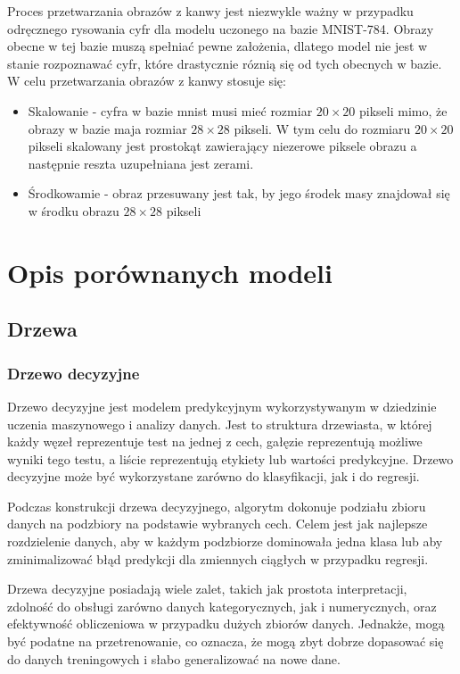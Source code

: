 \documentclass{article}
\begin{document}
Proces przetwarzania obrazów z kanwy jest niezwykle ważny
w przypadku odręcznego rysowania cyfr dla modelu uczonego
na bazie MNIST-784. Obrazy obecne w tej bazie muszą spełniać 
pewne założenia, dlatego model nie jest w stanie rozpoznawać
cyfr, które drastycznie róznią się od tych obecnych w bazie.
W celu przetwarzania obrazów z kanwy stosuje się:
\begin{itemize}
    \item Skalowanie - cyfra w bazie mnist musi mieć rozmiar $20\times20$ pikseli mimo, że obrazy w bazie maja rozmiar $28\times28$ pikseli. W tym celu do rozmiaru $20\times20$ pikseli skalowany jest prostokąt zawierający niezerowe piksele obrazu a następnie reszta uzupełniana jest zerami.
    \item Środkowamie - obraz przesuwany jest tak, by jego środek masy znajdował się w środku obrazu $28\times28$ pikseli
\end{itemize}



\section{Opis porównanych modeli}

\subsection{Drzewa}
\subsubsection{Drzewo decyzyjne}
Drzewo decyzyjne jest modelem predykcyjnym wykorzystywanym w 
dziedzinie uczenia maszynowego i analizy danych. Jest to 
struktura drzewiasta, w której każdy węzeł reprezentuje 
test na jednej z cech, gałęzie reprezentują możliwe wyniki 
tego testu, a liście reprezentują etykiety lub wartości 
predykcyjne. Drzewo decyzyjne może być wykorzystane 
zarówno do klasyfikacji, jak i do regresji.

Podczas konstrukcji drzewa decyzyjnego, 
algorytm dokonuje podziału zbioru danych 
na podzbiory na podstawie wybranych cech. 
Celem jest jak najlepsze rozdzielenie danych, 
aby w każdym podzbiorze dominowała jedna klasa 
lub aby zminimalizować błąd predykcji dla zmiennych 
ciągłych w przypadku regresji.

Drzewa decyzyjne posiadają wiele zalet, takich jak 
prostota interpretacji, zdolność do obsługi zarówno 
danych kategorycznych, jak i numerycznych, oraz efektywność 
obliczeniowa w przypadku dużych zbiorów danych. Jednakże, 
mogą być podatne na przetrenowanie, co oznacza, że mogą zbyt 
dobrze dopasować się do danych treningowych i słabo generalizować na nowe dane.
\end{document}
